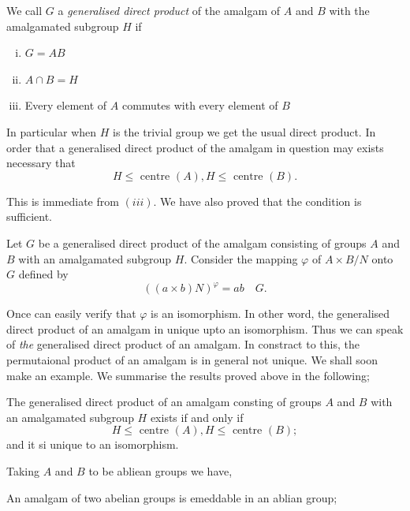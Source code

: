 We call $G$ a \textit{ generalised direct product } of the amalgam of
$A$ and $B$ with the amalgamated subgroup $H$ if  
\begin{enumerate}[(i)]
\item $G = AB$
\item $A \cap B = H$
\item Every element of $A$ commutes with every element of $B$ 
\end{enumerate}

In particular when $H$ is the trivial group we get the usual direct
product. In order that a generalised direct product of the amalgam in
question may exists necessary that  
$$
H \leq \text{ centre } (A), H \leq \text{ centre } (B).
$$

This is immediate from $(iii)$. We have also proved that the condition
is sufficient.  

Let $G$ be a generalised direct product of the amalgam consisting of
groups $A$ and $B$ with an amalgamated subgroup $H$. Consider the
mapping $\varphi$ of $A \times B /N$ onto $G$ defined by  
$$
(( a \times b)N) ^{\varphi}  = a b \quad G. 
$$

Once can easily verify that $\varphi$ is an isomorphism. In other
word, the generalised direct product of an amalgam in unique upto an
isomorphism. Thus we can speak of \textit{ the } generalised direct
product of an amalgam. In constract to this, the permutaional product
of an amalgam is in general not unique. We shall soon make an
example. We summarise the results proved above in the following;  
\setcounter{Theorem}{0}
\begin{Theorem}%
  The generalised direct product of an amalgam consting of groups $A$
  and $B$ with an amalgamated subgroup $H$ exists if and only if  
  $$
  H \leq \text{ centre }(A),H \leq \text{ centre }(B);
  $$
  and it si unique to an isomorphism. 
\end{Theorem}

Taking $A$ and $B$ to be abliean groups we have, 

\begin{corollary}%
  An amalgam of two abelian groups is emeddable in an ablian group; 
\end{corollary}

\section{ } %

